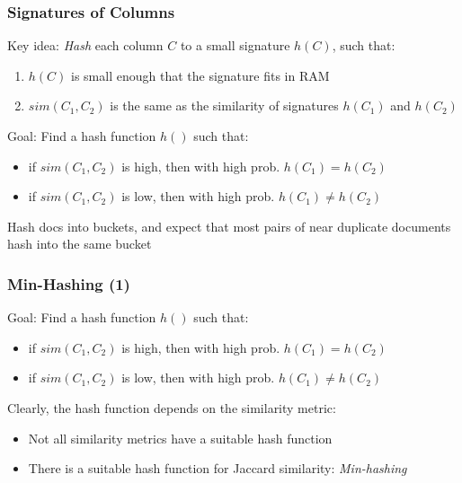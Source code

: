 \documentclass[svgnames]{beamer}
\begin{document}
\begin{frame} \frametitle{Signatures of Columns}

\begin{block}{Key idea:} 
\emph{Hash} each column $C$ to a small signature $h(C)$, such that:
\begin{enumerate}
  \item $h(C)$ is small enough that the signature fits in RAM
  \item $sim(C_1, C_2)$ is the same as the similarity of signatures $h(C_1)$ and $h(C_2)$
\end{enumerate}
\end{block}

\begin{block}{Goal:} 
Find a hash function $h()$ such that:
\begin{itemize}
\item if $sim(C_1,C_2)$ is high, then with high prob. $h(C_1) = h(C_2)$
\item if $sim(C_1,C_2)$ is low, then with high prob. $h(C_1) \neq h(C_2)$
\end{itemize}
\end{block}

Hash docs into buckets, and expect that most pairs of near duplicate documents hash into the same bucket
\end{frame}

  
\begin{frame} \frametitle{Min-Hashing (1)}

\begin{block}{Goal:} 
Find a hash function $h()$ such that:
\begin{itemize}
\item if $sim(C_1,C_2)$ is high, then with high prob. $h(C_1) = h(C_2)$
\item if $sim(C_1,C_2)$ is low, then with high prob. $h(C_1) \neq h(C_2)$
\end{itemize}
\end{block}

Clearly, the hash function depends on the similarity metric:

\begin{itemize}
  \item Not all similarity metrics have a suitable hash function
  \item There is a suitable hash function for Jaccard similarity: \emph{Min-hashing}
\end{itemize}  
\end{frame}
\end{document}
